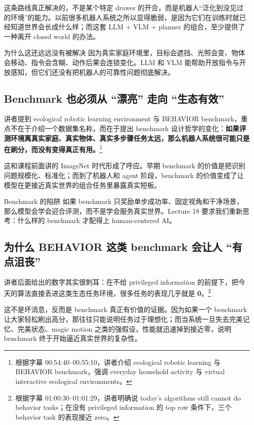 \documentclass[a4paper]{article}
\begin{document}
这条路线真正解决的，不是某个特定 drawer 的开合，而是机器人``泛化到没见过的环境''的能力。以前很多机器人系统之所以显得脆弱，是因为它们在训练时就已经知道世界会长成什么样；而这套 LLM + VLM + planner 的组合，至少提供了一种离开 closed world 的办法。

\begin{warningbox}{为什么这还远远没有被解决}
因为真实家庭环境里，目标会遮挡、光照会变、物体会移动、指令会含糊、动作后果会连锁变化。LLM 和 VLM 能帮助开放指令与开放感知，但它们还没有把机器人的可靠性问题彻底解决。
\end{warningbox}

\subsection{Benchmark 也必须从 ``漂亮'' 走向 ``生态有效''}

讲者提到 ecological robotic learning environment 与 BEHAVIOR benchmark，重点不在于介绍一个数据集名称，而在于提出 benchmark 设计哲学的变化：\textbf{如果评测环境离真实家庭、真实物体、真实多步骤任务太远，那么机器人系统很可能只是在刷分，而没有变得真正有用。}\footnote{根据字幕 00:54:40--00:55:10，讲者介绍 ecological robotic learning 与 BEHAVIOR benchmark，强调 everyday household activity 与 virtual interactive ecological environments。}

这和课程前面讲的 ImageNet 时代形成了呼应。早期 benchmark 的价值是把识别问题规模化、标准化；而到了机器人和 agent 阶段，benchmark 的价值变成了让模型在更接近真实世界的组合任务里暴露真实短板。

\begin{warningbox}{Benchmark 的陷阱}
如果 benchmark 只奖励单步成功率、固定视角和干净场景，那么模型会学会迎合评测，而不是学会服务真实世界。Lecture 18 要求我们重新思考：什么样的 benchmark 才配得上 human-centered AI。
\end{warningbox}

\subsection{为什么 BEHAVIOR 这类 benchmark 会让人 ``有点沮丧''}

讲者后面给出的数字其实很刺耳：在不给 privileged information 的前提下，把今天的算法直接丢进这类生态任务环境，很多任务的表现几乎就是 \textbf{0}。\footnote{根据字幕 01:00:30--01:01:29，讲者明确说 today's algorithms still cannot do behavior tasks；在没有 privileged information 的 top row 条件下，三个 behavior task 的表现接近 zero。}

这不是坏消息，反而是 benchmark 真正有价值的证据。因为如果一个 benchmark 让大家轻松刷出高分，那往往只能说明任务过于理想化；而当系统一旦失去完美记忆、完美状态、magic motion 之类的强假设，性能就迅速掉到接近零，说明 benchmark 终于开始逼近真实世界的复杂性。
\end{document}
